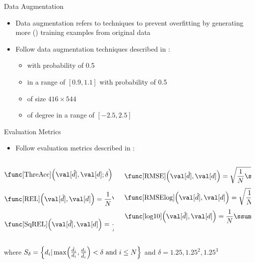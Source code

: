 \documentclass{cubeamer}
\begin{document}
\begin{frame}{Data Augmentation}
    \begin{itemize}
        \item Data augmentation refers to techniques to prevent overfitting by generating more () training examples from original data
        \item Follow data augmentation techniques described in \cite{adabins}:
        \begin{itemize}
            \item {} with probability of 0.5
            \item {} in a range of $[0.9, 1.1]$ with probability of 0.5
            \item {}  of size $416 \times 544$
            \item {} of degree in a range of $[-2.5,2.5]$
        \end{itemize}
    \end{itemize}
\end{frame}

\begin{frame}{Evaluation Metrics}
    \begin{itemize}
        \item Follow evaluation metrics described in \cite{eigen2014}:
    \end{itemize}
    \begin{columns}
        \begin{column}{0.4\textwidth}
            $$\func[\text{ThreAcc}]\parens*{\val[\hat{d}], \val[d] ; \delta} = \frac{\abs{S_{\delta}}}{N} \times 100\% $$
            $$\func[\text{REL}]\parens*{\val[\hat{d}], \val[d]} = \frac{1}{N}\ssum[i][1][N]\frac{\abs{\hat{d}_i - d_i}}{d_i} $$
            $$\func[\text{SqREL}]\parens*{\val[\hat{d}], \val[d]} = \frac{1}{N}\ssum[i][1][N]\frac{\norm{\hat{d}_i - d_i}}{d_i} $$
        \end{column}
        \begin{column}{0.6\textwidth}
            $$\func[\text{RMSE}]\parens*{\val[\hat{d}], \val[d]} = \sqrt{\frac{1}{N}\ssum[i][1][N]\parens*{\hat{d}_i - d_i}^2} $$
            $$\func[\text{RMSElog}]\parens*{\val[\hat{d}], \val[d]} = \sqrt{\frac{1}{N}\ssum[i][1][N]\norm{\hat{d}_i - d_i}^2} $$
            $$\func[\text{log10}]\parens*{\val[\hat{d}], \val[d]} = \frac{1}{N}\ssum[i][1][N]\abs{\log_{10}(\hat{d}_i) - \log_{10}(d_i)} $$
        \end{column}
    \end{columns}
    where $S_{\delta} = \cbracket*{d_i | \max\parens*{\frac{\hat{d}_i}{d_i},\frac{d_i}{\hat{d}_i}}<\delta \text{ and } i \leq N}$ and $\delta = 1.25, 1.25^2, 1.25^3$
\end{frame}
\end{document}
